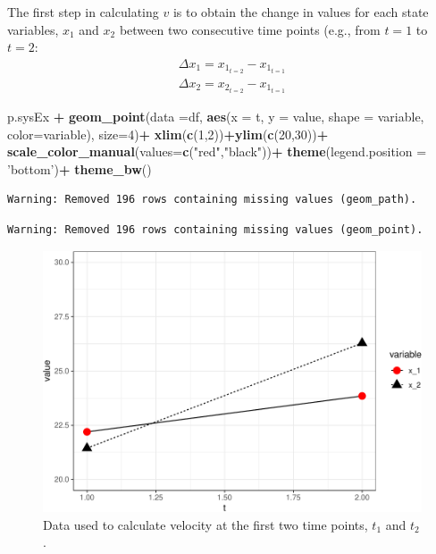 \documentclass[12pt,twoside,openany]{reedthesis}
\newenvironment{Shaded}{\begin{snugshade}}{\end{snugshade}}
\newcommand{\DataTypeTok}[1]{\textcolor[rgb]{0.13,0.29,0.53}{#1}}
\newcommand{\DecValTok}[1]{\textcolor[rgb]{0.00,0.00,0.81}{#1}}
\newcommand{\KeywordTok}[1]{\textcolor[rgb]{0.13,0.29,0.53}{\textbf{#1}}}
\newcommand{\NormalTok}[1]{#1}
\newcommand{\OperatorTok}[1]{\textcolor[rgb]{0.81,0.36,0.00}{\textbf{#1}}}
\newcommand{\StringTok}[1]{\textcolor[rgb]{0.31,0.60,0.02}{#1}}
\begin{document}
The first step in calculating \(v\) is to obtain the change in values for each state variables, \(x_1\) and \(x_2\) between two consecutive time points (e.g., from \(t=1\) to \(t=2\):
\begin{equation}
\begin{array}{rcr}
\Delta x_1 = x_{1_{t=2}} - x_{1_{t=1}} \\
\Delta x_2 = x_{2_{t=2}} - x_{1_{t=1}}
  \end{array}
\label{eq:diffX}
\end{equation}
\begin{Shaded}
\begin{Highlighting}[]
\NormalTok{p.sysEx }\OperatorTok{+}
\StringTok{  }\KeywordTok{geom_point}\NormalTok{(}\DataTypeTok{data =}\NormalTok{df, }\KeywordTok{aes}\NormalTok{(}\DataTypeTok{x =}\NormalTok{ t, }\DataTypeTok{y =}\NormalTok{ value, }\DataTypeTok{shape =}\NormalTok{ variable, }\DataTypeTok{color=}\NormalTok{variable), }\DataTypeTok{size=}\DecValTok{4}\NormalTok{)}\OperatorTok{+}
\StringTok{  }\KeywordTok{xlim}\NormalTok{(}\KeywordTok{c}\NormalTok{(}\DecValTok{1}\NormalTok{,}\DecValTok{2}\NormalTok{))}\OperatorTok{+}\KeywordTok{ylim}\NormalTok{(}\KeywordTok{c}\NormalTok{(}\DecValTok{20}\NormalTok{,}\DecValTok{30}\NormalTok{))}\OperatorTok{+}
\StringTok{  }\KeywordTok{scale_color_manual}\NormalTok{(}\DataTypeTok{values=}\KeywordTok{c}\NormalTok{(}\StringTok{"red"}\NormalTok{,}\StringTok{"black"}\NormalTok{))}\OperatorTok{+}
\StringTok{  }\KeywordTok{theme}\NormalTok{(}\DataTypeTok{legend.position =} \StringTok{'bottom'}\NormalTok{)}\OperatorTok{+}
\StringTok{  }\KeywordTok{theme_bw}\NormalTok{()}
\end{Highlighting}
\end{Shaded}
\begin{verbatim}
Warning: Removed 196 rows containing missing values (geom_path).
\end{verbatim}
\begin{verbatim}
Warning: Removed 196 rows containing missing values (geom_point).
\end{verbatim}
\begin{figure}
\centering
\includegraphics{_myDissertation_files/figure-latex/sysEx2-1.pdf}
\caption{\label{fig:sysEx2}Data used to calculate velocity at the first two time points, \(t_1\) and \(t_2\).}
\end{figure}
\end{document}
